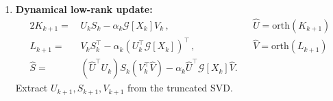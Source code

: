 \documentclass[12pt,a4paper]{article}
\begin{document}
\begin{enumerate}
    \item \textbf{Dynamical low-rank update:}
    \begin{alignat*}{2}
        K_{k+1} =\,& U_kS_k - \alpha_k \mathcal{G}[X_k]V_k\,, \quad &&\widehat U = \textrm{orth}(K_{k+1})\\
        L_{k+1} =\,& V_kS_k^{\top} - \alpha_k (U_k^{\top}\mathcal{G}[X_k])^{\top}\,, \quad &&\widehat V = \textrm{orth}(L_{k+1})\\
        \widehat S =\,& (\widehat U^{\top}U_k)S_k(V_k^{\top}\widehat V) - \alpha_k \widehat U^{\top}\mathcal{G}[X_k]\widehat V.
    \end{alignat*}
    Extract $U_{k+1}, S_{k+1}, V_{k+1}$ from the truncated SVD.
\end{enumerate}
\end{document}
